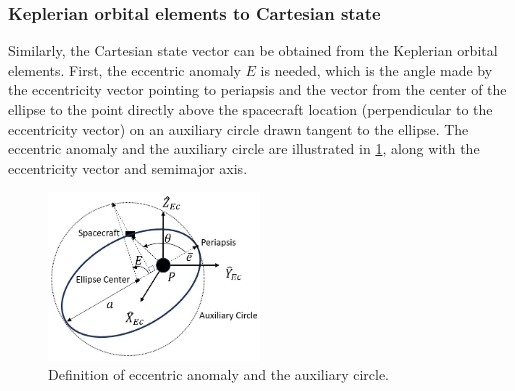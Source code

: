 \subsubsection{Keplerian orbital elements to Cartesian state}
Similarly, the Cartesian state vector can be obtained from the Keplerian orbital elements. First,
the eccentric anomaly $E$ is needed, which is the angle made by the eccentricity vector pointing to
periapsis and the vector from the center of the ellipse to the point directly above the spacecraft
location (perpendicular to the eccentricity vector) on an auxiliary circle drawn tangent to the
ellipse. The eccentric anomaly and the auxiliary circle are illustrated in \cref{fig:auxCircle}, along
with the eccentricity vector and semimajor axis.

\begin{figure}[ht]
    \centering
    \includegraphics[width=0.5\textwidth]{figures/AuxCircle.jpg}
    \caption{Definition of eccentric anomaly and the auxiliary circle.}
    \label{fig:auxCircle}
\end{figure}

